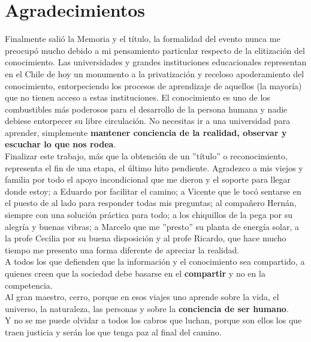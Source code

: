 \chapter*{Agradecimientos}
\label{agradecimiento}

\normalsize Finalmente salió la Memoria y el título, la formalidad del evento nunca me preocupó mucho debido a mi pensamiento particular respecto de la elitización del conocimiento. Las universidades y grandes instituciones educacionales representan en el Chile de hoy un monumento a la privatización y receloso apoderamiento del conocimiento, entorpeciendo los procesos de aprendizaje de aquellos (la mayoría) que no tienen acceso a estas instituciones. El conocimiento es uno de los combustibles más poderosos para el desarrollo de la persona humana y nadie debiese entorpecer su libre circulación. No necesitas ir a una universidad para aprender, simplemente \textbf{mantener conciencia de la realidad, observar y escuchar lo que nos rodea}.\\

\normalsize Finalizar este trabajo, más que la obtención de un ''título'' o reconocimiento, representa el fin de una etapa, el último hito pendiente. Agradezco a mis viejos y familia por todo el apoyo incondicional que me dieron y el soporte para llegar donde estoy; a Eduardo por facilitar el camino; a Vicente que le tocó sentarse en el puesto de al lado para responder todas mis preguntas; al compañero Hernán, siempre con una solución práctica para todo; a los chiquillos de la pega por su alegría y buenas vibras; a Marcelo que me ''presto'' su planta de energía solar, a la profe Cecilia por su buena disposición y al profe Ricardo, que hace mucho tiempo me presento una forma diferente de apreciar la realidad.\\

\normalsize A todos los que defienden que la información y el conocimiento sea compartido, a quienes creen que la sociedad debe basarse en el \textbf{compartir} y no en la competencia.\\

\normalsize Al gran maestro, cerro, porque en esos viajes uno aprende sobre la vida, el universo, la naturaleza, las personas y sobre la \textbf{conciencia de ser humano}.\\

\normalsize Y no se me puede olvidar a todos los cabros que luchan, porque son ellos los que traen justicia y serán los que tenga paz al final del camino.
